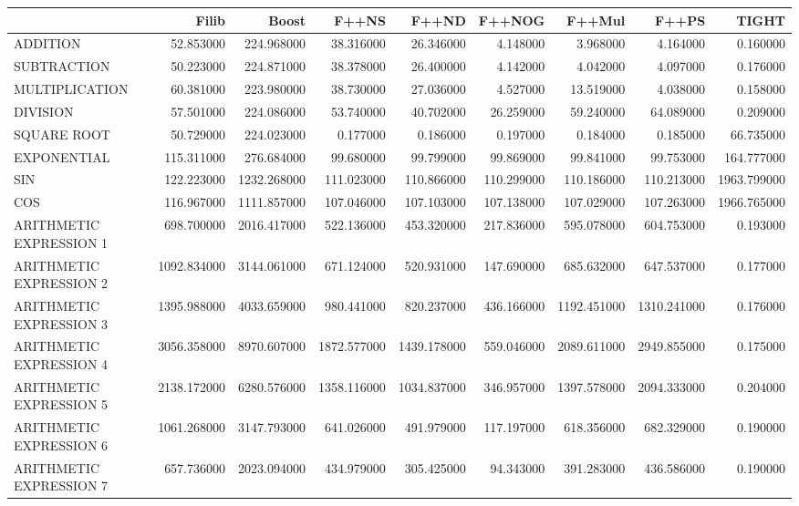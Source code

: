 \clearpage
\onecolumn
\begingroup

\small
\begin{longtable}{lrrrrrrrr}
\hline
& Filib & Boost & F++NS & F++ND & F++NOG & F++Mul & F++PS & TIGHT \\
\hline
ADDITION & 52.853000 & 224.968000 & 38.316000 & 26.346000 & 4.148000 & 3.968000 & 4.164000 & 0.160000 \\
SUBTRACTION & 50.223000 & 224.871000 & 38.378000 & 26.400000 & 4.142000 & 4.042000 & 4.097000 & 0.176000 \\
MULTIPLICATION & 60.381000 & 223.980000 & 38.730000 & 27.036000 & 4.527000 & 13.519000 & 4.038000 & 0.158000 \\
DIVISION & 57.501000 & 224.086000 & 53.740000 & 40.702000 & 26.259000 & 59.240000 & 64.089000 & 0.209000 \\
SQUARE ROOT & 50.729000 & 224.023000 & 0.177000 & 0.186000 & 0.197000 & 0.184000 & 0.185000 & 66.735000 \\
EXPONENTIAL & 115.311000 & 276.684000 & 99.680000 & 99.799000 & 99.869000 & 99.841000 & 99.753000 & 164.777000 \\
SIN & 122.223000 & 1232.268000 & 111.023000 & 110.866000 & 110.299000 & 110.186000 & 110.213000 & 1963.799000 \\
COS & 116.967000 & 1111.857000 & 107.046000 & 107.103000 & 107.138000 & 107.029000 & 107.263000 & 1966.765000 \\
ARITHMETIC EXPRESSION 1 & 698.700000 & 2016.417000 & 522.136000 & 453.320000 & 217.836000 & 595.078000 & 604.753000 & 0.193000 \\
ARITHMETIC EXPRESSION 2 & 1092.834000 & 3144.061000 & 671.124000 & 520.931000 & 147.690000 & 685.632000 & 647.537000 & 0.177000 \\
ARITHMETIC EXPRESSION 3 & 1395.988000 & 4033.659000 & 980.441000 & 820.237000 & 436.166000 & 1192.451000 & 1310.241000 & 0.176000 \\
ARITHMETIC EXPRESSION 4 & 3056.358000 & 8970.607000 & 1872.577000 & 1439.178000 & 559.046000 & 2089.611000 & 2949.855000 & 0.175000 \\
ARITHMETIC EXPRESSION 5 & 2138.172000 & 6280.576000 & 1358.116000 & 1034.837000 & 346.957000 & 1397.578000 & 2094.333000 & 0.204000 \\
ARITHMETIC EXPRESSION 6 & 1061.268000 & 3147.793000 & 641.026000 & 491.979000 & 117.197000 & 618.356000 & 682.329000 & 0.190000 \\
ARITHMETIC EXPRESSION 7 & 657.736000 & 2023.094000 & 434.979000 & 305.425000 & 94.343000 & 391.283000 & 436.586000 & 0.190000 \\

\end{longtable}
